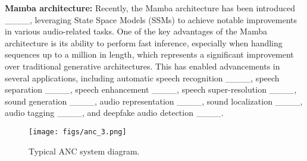 \textbf{Mamba architecture:} Recently, the Mamba architecture has been introduced ____, leveraging State Space Models (SSMs) to achieve notable improvements in various audio-related tasks. One of the key advantages of the Mamba architecture is its ability to perform fast inference, especially when handling sequences up to a million in length, which represents a significant improvement over traditional generative architectures. This has enabled advancements in several applications, including automatic speech recognition ____, speech separation ____, speech enhancement ____, speech super-resolution ____, sound generation ____, audio representation ____, sound localization ____, audio tagging ____, and deepfake audio detection ____. 

\begin{figure}[t]
\centering
\begin{minipage}{.45\textwidth}
\centering
\texttt{[image: figs/anc\_3.png]}
\caption{Typical ANC system diagram.}
\label{figs:anc}
\end{minipage}%
\end{figure}